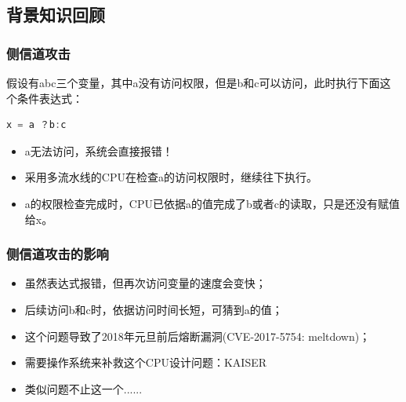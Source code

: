 \subsection{背景知识回顾} %
\begin{frame}[fragile]
    \frametitle{侧信道攻击}
    \begin{block}{}
    假设有abc三个变量，其中a没有访问权限，但是b和c可以访问，此时执行下面这个条件表达式：
    \begin{lstlisting}[language = C]
        x = a ？b:c
    \end{lstlisting}
    \end{block} \pause
	    \begin{itemize}
	        \item a无法访问，系统会直接报错！ \pause
	        \item 采用多流水线的CPU在检查a的访问权限时，继续往下执行。 \pause
	        \item a的权限检查完成时，CPU已依据a的值完成了b或者c的读取，只是还没有赋值给x。
	    \end{itemize}
\end{frame}
\begin{frame}[fragile]
    \frametitle{侧信道攻击的影响}
	    \begin{itemize}
	        \item 虽然表达式报错，但再次访问变量的速度会变快；
	        \item 后续访问b和c时，依据访问时间长短，可猜到a的值； \pause
	        \item 这个问题导致了2018年元旦前后熔断漏洞(CVE-2017-5754: meltdown)； \pause
	        \item 需要操作系统来补救这个CPU设计问题：KAISER \pause
	        \item 类似问题不止这一个......
	    \end{itemize}
\end{frame}


